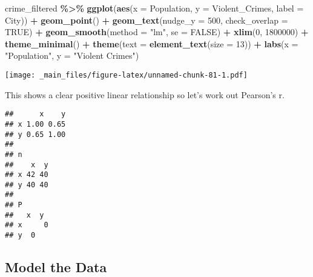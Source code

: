 \documentclass[
]{book}
\newenvironment{Shaded}{\begin{snugshade}}{\end{snugshade}}
\newcommand{\AttributeTok}[1]{\textcolor[rgb]{0.13,0.29,0.53}{#1}}
\newcommand{\ConstantTok}[1]{\textcolor[rgb]{0.56,0.35,0.01}{#1}}
\newcommand{\DecValTok}[1]{\textcolor[rgb]{0.00,0.00,0.81}{#1}}
\newcommand{\FunctionTok}[1]{\textcolor[rgb]{0.13,0.29,0.53}{\textbf{#1}}}
\newcommand{\NormalTok}[1]{#1}
\newcommand{\SpecialCharTok}[1]{\textcolor[rgb]{0.81,0.36,0.00}{\textbf{#1}}}
\newcommand{\StringTok}[1]{\textcolor[rgb]{0.31,0.60,0.02}{#1}}
\begin{document}
\begin{Shaded}
\begin{Highlighting}[]
\NormalTok{crime\_filtered }\SpecialCharTok{\%\textgreater{}\%}
  \FunctionTok{ggplot}\NormalTok{(}\FunctionTok{aes}\NormalTok{(}\AttributeTok{x =}\NormalTok{ Population, }\AttributeTok{y =}\NormalTok{ Violent\_Crimes, }\AttributeTok{label =}\NormalTok{ City)) }\SpecialCharTok{+} 
  \FunctionTok{geom\_point}\NormalTok{() }\SpecialCharTok{+} 
  \FunctionTok{geom\_text}\NormalTok{(}\AttributeTok{nudge\_y =} \DecValTok{500}\NormalTok{, }\AttributeTok{check\_overlap =} \ConstantTok{TRUE}\NormalTok{) }\SpecialCharTok{+} 
  \FunctionTok{geom\_smooth}\NormalTok{(}\AttributeTok{method =} \StringTok{"lm"}\NormalTok{, }\AttributeTok{se =} \ConstantTok{FALSE}\NormalTok{) }\SpecialCharTok{+} 
  \FunctionTok{xlim}\NormalTok{(}\DecValTok{0}\NormalTok{, }\DecValTok{1800000}\NormalTok{) }\SpecialCharTok{+}
  \FunctionTok{theme\_minimal}\NormalTok{() }\SpecialCharTok{+}
  \FunctionTok{theme}\NormalTok{(}\AttributeTok{text =} \FunctionTok{element\_text}\NormalTok{(}\AttributeTok{size =} \DecValTok{13}\NormalTok{)) }\SpecialCharTok{+}
  \FunctionTok{labs}\NormalTok{(}\AttributeTok{x =} \StringTok{"Population"}\NormalTok{, }
       \AttributeTok{y =} \StringTok{"Violent Crimes"}\NormalTok{)}
\end{Highlighting}
\end{Shaded}

\texttt{[image: \_main\_files/figure-latex/unnamed-chunk-81-1.pdf]}

This shows a clear positive linear relationship so let's work out Pearson's r.

\begin{Shaded}
\end{Shaded}

\begin{verbatim}
##      x    y
## x 1.00 0.65
## y 0.65 1.00
## 
## n
##    x  y
## x 42 40
## y 40 40
## 
## P
##   x  y 
## x     0
## y  0
\end{verbatim}

\hypertarget{model-the-data}{%
\subsection{Model the Data}\label{model-the-data}}
\end{document}
